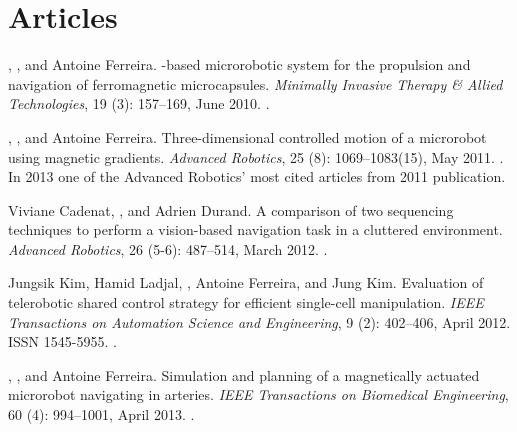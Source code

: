 
\section{Articles}

\begin{Mybibliography}{99}

  \KBelharet, \DavidFolio, and Antoine Ferreira.
  -based microrobotic system for the propulsion and navigation of
  ferromagnetic microcapsules.
  \newblock \emph{Minimally Invasive Therapy \& Allied Technologies}, 19
  (3): 157--169, June 2010{}.
  \newblock {}.
  
  \KBelharet, \DavidFolio, and Antoine Ferreira.
  \newblock Three-dimensional controlled motion of a microrobot using magnetic
  gradients.
  \newblock \emph{Advanced Robotics}, 25 (8): 1069--1083(15),
  May 2011.
  \newblock {}.
  \newblock In 2013 one of the Advanced Robotics' most cited articles from 2011
  publication.
  
 
 Viviane Cadenat, \DavidFolio, and Adrien Durand.
 \newblock A comparison of two sequencing techniques to perform a vision-based
 navigation task in a cluttered environment.
 \newblock \emph{Advanced Robotics}, 26 (5-6): 487--514, March
 2012.
 \newblock {}.
  
  Jungsik Kim, Hamid Ladjal, \DavidFolio, Antoine Ferreira, and Jung Kim.
  \newblock Evaluation of telerobotic shared control strategy for efficient
  single-cell manipulation.
  \newblock \emph{{IEEE} Transactions on Automation Science and Engineering},
  9 (2): 402--406, April 2012.
  \newblock ISSN 1545-5955.
  \newblock {}.

  
  \KBelharet, \DavidFolio, and Antoine Ferreira.
  \newblock Simulation and planning of a magnetically actuated microrobot
  navigating in arteries.
  \newblock \emph{{IEEE} Transactions on Biomedical Engineering}, 60
  (4): 994--1001, April 2013{}.
  \newblock {}.
  

\end{Mybibliography}
